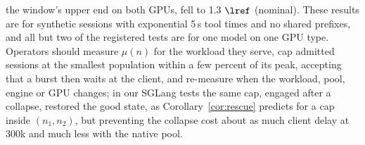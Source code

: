 the window's upper end on both GPUs, fell to 1.3 $\lref$ (nominal). These results are for synthetic sessions with exponential 5\,s tool times and no shared prefixes, and all but two of the registered tests are for one model on one GPU type. Operators should measure $\mu(n)$ for the workload they serve, cap admitted sessions at the smallest population within a few percent of its peak, accepting that a burst then waits at the client, and re-measure when the workload, pool, engine or GPU changes; in our SGLang tests the same cap, engaged after a collapse, restored the good state, as Corollary~\ref{cor:rescue} predicts for a cap inside $(n_1,n_2)$, but preventing the collapse cost about as much client delay at 300k and much less with the native pool.
